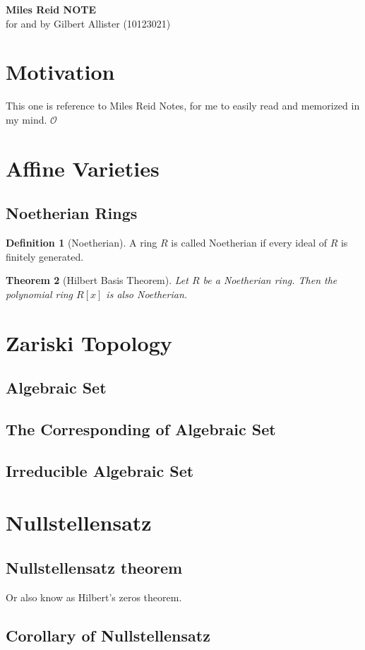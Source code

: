 \documentclass[12pt, a4paper]{article}
\newtheorem{theorem}{Theorem}[section]
\theoremstyle{definition}
\newtheorem{definition}[theorem]{Definition}
\begin{document}
    \thispagestyle{firstpage}

    \begin{center}
        \vspace*{0.8cm}
        {\large\bfseries Miles Reid NOTE} \\[0.6cm]
        {\normalsize for and by Gilbert Allister (10123021)}
        \vspace*{0.8cm}
    \end{center}



    \section{Motivation}
    This one is reference to Miles Reid Notes, for me to easily read and memorized in my mind.  
    $\mathcal{O}$

    \section{Affine Varieties}
    \subsection{Noetherian Rings}
    \begin{definition}[Noetherian]
        A ring $R$ is called Noetherian if every ideal of $R$ is finitely generated.     
    \end{definition}

    \begin{theorem}[Hilbert Basis Theorem]
        Let $R$ be a Noetherian ring. Then the polynomial ring $R[x]$ is also Noetherian.
    \end{theorem}


    \section{Zariski Topology}
    \subsection{Algebraic Set}

    \subsection{The Corresponding of Algebraic Set}

    \subsection{Irreducible Algebraic Set}


    \section{Nullstellensatz}
    \subsection{Nullstellensatz theorem}
    Or also know as Hilbert's zeros theorem. 

    \subsection{Corollary of Nullstellensatz}
\end{document}
